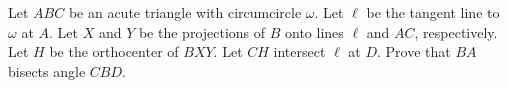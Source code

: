 Let $ABC$ be an acute triangle with circumcircle $\omega$. Let $\ell$ be the tangent line to $\omega$ at $A$. Let $X$ and $Y$ be the projections of $B$ onto lines $\ell$ and $AC$, respectively. Let $H$ be the orthocenter of $BXY$. Let $CH$ intersect $\ell$ at $D$. Prove that $BA$ bisects angle $CBD$.